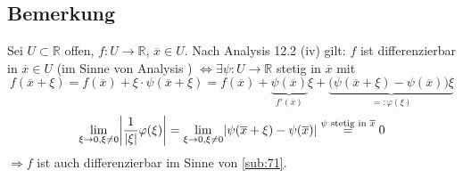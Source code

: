 \subsection[Bemerkung: Vergleich der Differenzierbarkeits-Begriffe]{Bemerkung} %
\label{sub:72}
Sei $U \subset \mathds{R}$ offen, $f : U \to \mathds{R}$, $\overline{x} \in U$. Nach Analysis  12.2 (iv) gilt: $f$ ist differenzierbar in $\overline{x} \in U$ (im
Sinne von Analysis ) $\iff \exists \psi : U  \to \mathds{R}$ stetig in $\overline{x}$ mit 
\[
	f(\overline{x} + \xi) = f(\overline{x} ) + \xi \cdot \psi( \overline{x} + \xi) = f(\overline{x} ) + \underbrace{\psi (\overline{x} )}_{f'(\overline{x} )} \xi + 
	\underbrace{ \big(\psi (\overline{x} + \xi) - \psi (\overline{x} )\big) \xi}_{=: \varphi(\xi)}
\]
\[
	\lim_{ \xi \to 0, \xi \not= 0} \abs*{\frac{1}{\abs*{\xi} } \varphi (\xi) }  = \lim_{ \xi \to 0, \xi \not= 0} \abs*{\psi (\overline{x} + \xi) - \psi (\overline{x} )}
	\stackrel{\text{$\psi$ stetig in $\overline{x} $}}{=} 0
\]
$\Rightarrow f$ ist auch differenzierbar im Sinne von \ref{sub:71}.
